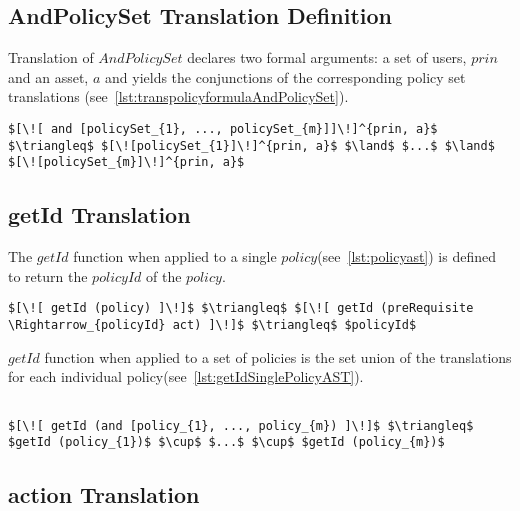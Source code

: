 \subsection{AndPolicySet Translation Definition}
Translation of $AndPolicySet$ declares two formal arguments: a set of users, $prin$ and an asset, $a$ and yields the conjunctions of the corresponding policy set translations (see~\ref{lst:transpolicyformulaAndPolicySet}). 

\lstset{mathescape, language=AST}  
\begin{lstlisting}[frame=single, caption={Policy Set Translation Definition {$\colon$} AndPolicySet},label={lst:transpolicyformulaAndPolicySet}]
$[\![ and [policySet_{1}, ..., policySet_{m}]]\!]^{prin, a}$ $\triangleq$ $[\![policySet_{1}]\!]^{prin, a}$ $\land$ $...$ $\land$ $[\![policySet_{m}]\!]^{prin, a}$

\end{lstlisting}


\subsection{getId Translation}\label{sec:getIdtranslation}

The $getId$ function when applied to a single $policy$(see~\ref{lst:policyast}) is defined to return the $policyId$ of the $policy$.

\lstset{mathescape, language=AST}  
\begin{lstlisting}[frame=single, caption={getId for a Single policy},label={lst:getIdSinglePolicyAST}]
$[\![ getId (policy) ]\!]$ $\triangleq$ $[\![ getId (preRequisite \Rightarrow_{policyId} act) ]\!]$ $\triangleq$ $policyId$
\end{lstlisting}

$getId$ function when applied to a set of policies is the set union of the translations for each individual policy(see~\ref{lst:getIdSinglePolicyAST}).

\lstset{mathescape, language=AST}  
\begin{lstlisting}[frame=single, caption={getId for Policies Definition},label={lst:getIdAndPolicyAST}]

$[\![ getId (and [policy_{1}, ..., policy_{m}) ]\!]$ $\triangleq$ $getId (policy_{1})$ $\cup$ $...$ $\cup$ $getId (policy_{m})$
\end{lstlisting}

\subsection{action Translation}\label{sec:acttranslation}

